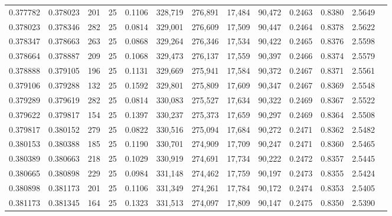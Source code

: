 \begin{tabular}{rrrrrrrrrrrrr}
0.377782 & 0.378023 &   201 &  25 &                                     0.1106 & 328,719 & 276,891 &  17,484 &  90,472 & 0.2463 & 0.8380 & 2.5649 \\
0.378023 & 0.378346 &   282 &  25 &                                     0.0814 & 329,001 & 276,609 &  17,509 &  90,447 & 0.2464 & 0.8378 & 2.5622 \\
0.378347 & 0.378663 &   263 &  25 &                                     0.0868 & 329,264 & 276,346 &  17,534 &  90,422 & 0.2465 & 0.8376 & 2.5598 \\
0.378664 & 0.378887 &   209 &  25 &                                     0.1068 & 329,473 & 276,137 &  17,559 &  90,397 & 0.2466 & 0.8374 & 2.5579 \\
0.378888 & 0.379105 &   196 &  25 &                                     0.1131 & 329,669 & 275,941 &  17,584 &  90,372 & 0.2467 & 0.8371 & 2.5561 \\
0.379106 & 0.379288 &   132 &  25 &                                     0.1592 & 329,801 & 275,809 &  17,609 &  90,347 & 0.2467 & 0.8369 & 2.5548 \\
0.379289 & 0.379619 &   282 &  25 &                                     0.0814 & 330,083 & 275,527 &  17,634 &  90,322 & 0.2469 & 0.8367 & 2.5522 \\
0.379622 & 0.379817 &   154 &  25 &                                     0.1397 & 330,237 & 275,373 &  17,659 &  90,297 & 0.2469 & 0.8364 & 2.5508 \\
0.379817 & 0.380152 &   279 &  25 &                                     0.0822 & 330,516 & 275,094 &  17,684 &  90,272 & 0.2471 & 0.8362 & 2.5482 \\
0.380153 & 0.380388 &   185 &  25 &                                     0.1190 & 330,701 & 274,909 &  17,709 &  90,247 & 0.2471 & 0.8360 & 2.5465 \\
0.380389 & 0.380663 &   218 &  25 &                                     0.1029 & 330,919 & 274,691 &  17,734 &  90,222 & 0.2472 & 0.8357 & 2.5445 \\
0.380665 & 0.380898 &   229 &  25 &                                     0.0984 & 331,148 & 274,462 &  17,759 &  90,197 & 0.2473 & 0.8355 & 2.5424 \\
0.380898 & 0.381173 &   201 &  25 &                                     0.1106 & 331,349 & 274,261 &  17,784 &  90,172 & 0.2474 & 0.8353 & 2.5405 \\
0.381173 & 0.381345 &   164 &  25 &                                     0.1323 & 331,513 & 274,097 &  17,809 &  90,147 & 0.2475 & 0.8350 & 2.5390 \\

\end{tabular}
